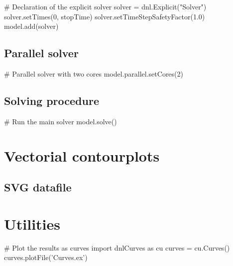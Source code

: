 \begin{PythonListing}
# Declaration of the explicit solver
solver = dnl.Explicit("Solver")
solver.setTimes(0, stopTime)
solver.setTimeStepSafetyFactor(1.0)
model.add(solver)
\end{PythonListing}

\subsection{Parallel solver}

\begin{PythonListing}
# Parallel solver with two cores
model.parallel.setCores(2)
\end{PythonListing}

\subsection{Solving procedure}

\begin{PythonListing}
# Run the main solver
model.solve()
\end{PythonListing}

\section{Vectorial contourplots}

\subsection{SVG datafile}

\section{Utilities}

\begin{PythonListing}
# Plot the results as curves
import dnlCurves as cu
curves = cu.Curves()
curves.plotFile('Curves.ex')
\end{PythonListing}
